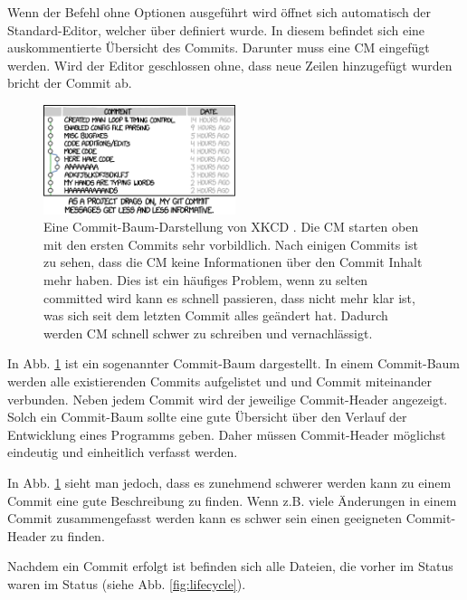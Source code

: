 Wenn der Befehl  ohne Optionen ausgeführt wird öffnet sich automatisch der Standard-Editor, welcher über  definiert wurde. In diesem befindet sich eine auskommentierte Übersicht des Commits. Darunter muss eine CM eingefügt werden. Wird der Editor geschlossen ohne, dass neue Zeilen hinzugefügt wurden bricht der Commit ab.
\begin{figure}[!h]
        \centering
        \includegraphics[width=0.5\textwidth]{Bilder/git_commit.png}
        \caption{Eine Commit-Baum-Darstellung von XKCD \cite{Munroe}. Die CM starten oben mit den ersten Commits sehr vorbildlich. Nach einigen Commits ist zu sehen, dass die CM keine Informationen über den Commit Inhalt mehr haben. Dies ist ein häufiges Problem, wenn zu selten committed wird kann es schnell passieren, dass nicht mehr klar ist, was sich seit dem letzten Commit alles geändert hat. Dadurch werden CM schnell schwer zu schreiben und vernachlässigt.}
        \label{fig:Commit-XKCD}
\end{figure}

In Abb. \ref{fig:Commit-XKCD} ist ein sogenannter Commit-Baum dargestellt. In einem Commit-Baum werden alle existierenden Commits aufgelistet und  und  Commit miteinander verbunden. Neben jedem Commit wird der jeweilige Commit-Header angezeigt. Solch ein Commit-Baum sollte eine gute Übersicht über den Verlauf der Entwicklung eines Programms geben. Daher müssen Commit-Header möglichst eindeutig und einheitlich verfasst werden.

In Abb. \ref{fig:Commit-XKCD} sieht man jedoch, dass es zunehmend schwerer werden kann zu einem Commit eine gute Beschreibung zu finden. Wenn z.B. viele Änderungen in einem Commit zusammengefasst werden kann es schwer sein einen geeigneten Commit-Header zu finden.

Nachdem ein Commit erfolgt ist befinden sich alle Dateien, die vorher im  Status waren im  Status (siehe Abb. \ref{fig:lifecycle}). 
%
